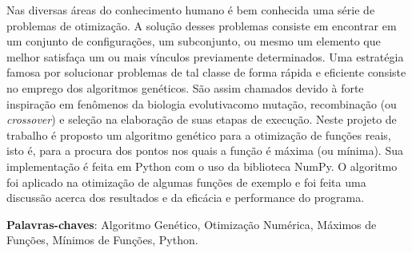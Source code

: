 Nas diversas áreas do conhecimento humano é bem conhecida uma série de problemas de otimização. 
A solução desses problemas consiste em encontrar em um conjunto de configurações, um subconjunto,
ou mesmo um elemento que melhor satisfaça um ou mais vínculos previamente determinados. Uma
estratégia famosa por solucionar problemas de tal classe de forma rápida e eficiente consiste no
emprego dos algoritmos genéticos. São assim chamados devido à forte inspiração em fenômenos
da biologia evolutiva\trav como mutação, recombinação (ou \textit{crossover}) e seleção\trav
na elaboração de suas etapas de execução. Neste projeto de trabalho é proposto um algoritmo genético para
a otimização de funções reais, isto é, para a procura dos pontos nos quais a função é máxima
(ou mínima). Sua implementação é feita em Python com o uso da biblioteca NumPy. 
O algoritmo foi aplicado na otimização de algumas funções de exemplo e foi feita uma discussão acerca dos
resultados e da eficácia e performance do programa. 

\vspace{\onelineskip}\noindent
\textbf{Palavras-chaves}: Algoritmo Genético, Otimização Numérica, Máximos de Funções, Mínimos de Funções, Python.
